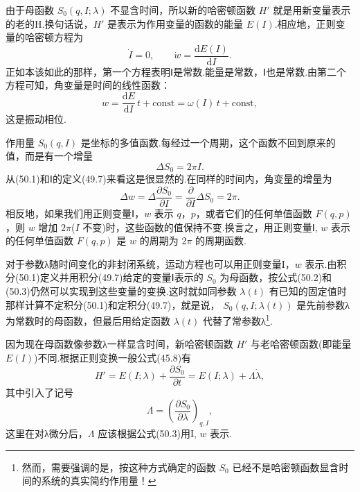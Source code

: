 由于母函数 $S_0(q,I;\lambda)$
不显含时间，所以新的哈密顿函数 $H'$
就是用新变量表示的老的H.换句话说，$H'$
是表示为作用变量的函数的能量 $E(I)$.相应地，正则变量的哈密顿方程为
\begin{equation}
  \dot{I}=0,\qquad \dot{w}=\frac{\mathrm{d}E(I)}{\mathrm{d}I}.
\end{equation}
正如本该如此的那样，第一个方程表明Ⅰ是常数.能量是常数，Ⅰ也是常数.由第二个方程可知，角变量是时间的线性函数：
\begin{equation}
  w=\frac{\mathrm{d}E}{\mathrm{d}I}\,t+\mathrm{const}
  =\omega(I)\,t+\mathrm{const},
\end{equation}
这是振动相位.

作用量 $S_0(q,I)$
是坐标的多值函数.每经过一个周期，这个函数不回到原来的值，而是有一个增量
\begin{equation}
  \Delta S_0=2\pi I.
\end{equation}
从(50.1)和Ⅰ的定义(49.7)来看这是很显然的.在同样的时间内，角变量的增量为
\begin{equation}
  \Delta w=\Delta\frac{\partial S_0}{\partial I}
  =\frac{\partial}{\partial I}\Delta S_0=2\pi.
\end{equation}
相反地，如果我们用正则变量Ⅰ，$w$ 表示 $q$，$p$，或者它们的任何单值函数
$F(q,p)$，则 $w$ 增加 $2\pi$($I$
不变)时，这些函数的值保持不变.换言之，用正则变量Ⅰ, $w$
表示的任何单值函数 $F(q,p)$ 是 $w$ 的周期为 $2\pi$ 的周期函数.

对于参数λ随时间变化的非封闭系统，运动方程也可以用正则变量I，$w$
表示.由积分(50.1)定义并用积分(49.7)给定的变量Ⅰ表示的 $S_0$
为母函数，按公式(50.2)和(50.3)仍然可以实现到这些变量的变换.这时就如同参数
$\lambda(t)$
有已知的固定值时那样计算不定积分(50.1)和定积分(49.7)，就是说，
$S_0(q,I;\lambda(t))$
是先前参数λ为常数时的母函数，但最后用给定函数 $\lambda(t)$
代替了常参数λ\footnote{然而，需要强调的是，按这种方式确定的函数 $S_0$ 已经不是哈密顿函数显含时间的系统的真实简约作用量！}.

因为现在母函数像参数λ一样显含时间，新哈密顿函数 $H'$
与老哈密顿函数(即能量 $E(I)$)不同.根据正则变换一般公式(45.8)有
\begin{equation}
  H'=E(I;\lambda)+\frac{\partial S_0}{\partial t}
  =E(I;\lambda)+\Lambda\dot{\lambda},
\end{equation}
其中引入了记号
\begin{equation}
  \Lambda=\left(\frac{\partial S_0}{\partial\lambda}\right)_{q,I},
\end{equation}
这里在对λ微分后，$\Lambda$ 应该根据公式(50.3)用I, $w$ 表示.

